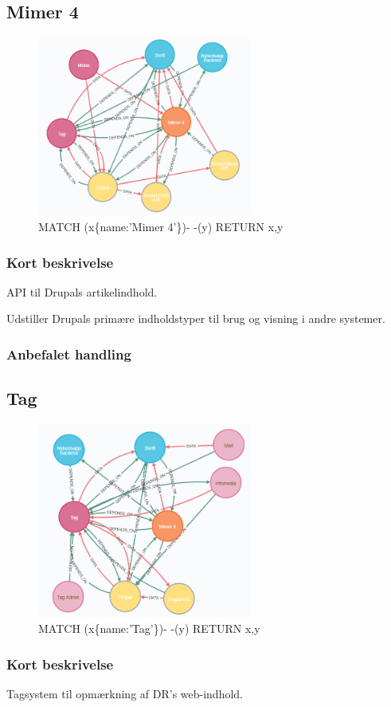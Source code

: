 \documentclass{article}
\begin{document}
\subsection{Mimer 4}
\begin{figure}[h]
\includegraphics[width=200pt]{Mimer4.PNG}
\caption{MATCH (x\{name:'Mimer 4'\})- -(y) RETURN x,y}
\end{figure}
\subsubsection{Kort beskrivelse}
API til Drupals artikelindhold.

Udstiller Drupals primære indholdstyper til brug og visning i andre systemer.
\subsubsection{Anbefalet handling}



\subsection{Tag}
\begin{figure}[h]
\includegraphics[width=200pt]{Tag.PNG}
\caption{MATCH (x\{name:'Tag'\})- -(y) RETURN x,y}
\end{figure}
\subsubsection{Kort beskrivelse}
Tagsystem til opmærkning af DR's web-indhold.
\end{document}
